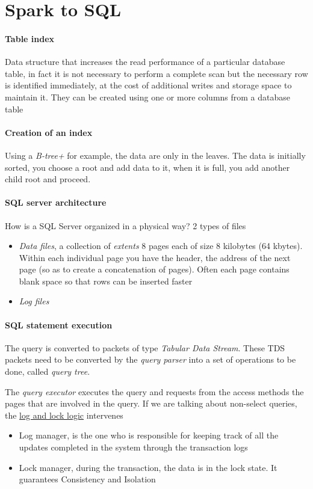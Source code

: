 \section{Spark to SQL}

\paragraph{Table index} 
Data structure that increases the read performance of a particular database table, in fact it is not necessary to perform a complete scan but the necessary row is identified immediately, at the cost of additional writes and storage space to maintain it. They can be created using one or more columns from a database table

\paragraph{Creation of an index} 
Using a \textit{B-tree+} for example, the data are only in the leaves. The data is initially sorted, you choose a root and add data to it, when it is full, you add another child root and proceed.

\paragraph{SQL server architecture}
How is a SQL Server organized in a physical way? 2 types of files
\begin{itemize}
    \item \textit{Data files}, a collection of \textit{extents} 8 pages each of size 8 kilobytes (64 kbytes). Within each individual page you have the header, the address of the next page (so as to create a concatenation of pages). Often each page contains blank space so that rows can be inserted faster
    \item \textit{Log files}
\end{itemize}

\paragraph{SQL statement execution}
The query is converted to packets of type \textit{Tabular Data Stream}. These TDS packets need to be converted by the \textit{query parser} into a set of operations to be done, called \textit{query tree}.

The \textit{query executor} executes the query and requests from the access methods the pages that are involved in the query. If we are talking about non-select queries, the \uline{log and lock logic} intervenes
\begin{itemize}
    \item Log manager, is the one who is responsible for keeping track of all the updates completed in the system through the transaction logs
    \item Lock manager, during the transaction, the data is in the lock state. It guarantees Consistency and Isolation
\end{itemize}

